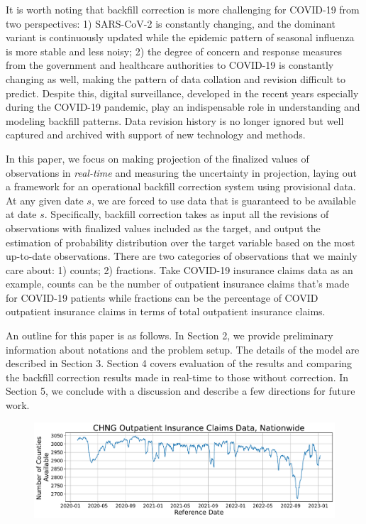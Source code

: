 It is worth noting that backfill correction is more challenging for COVID-19 from two perspectives: 1) SARS-CoV-2 is constantly changing, and the dominant variant is continuously updated while the epidemic pattern of seasonal influenza is more stable and less noisy; 2) the degree of concern and response measures from the government and healthcare authorities to COVID-19 is constantly changing as well, making the pattern of data collation and revision difficult to predict. Despite this, digital surveillance, developed in the recent years especially during the COVID-19 pandemic, play an indispensable role in understanding and modeling backfill patterns. Data revision history is no longer ignored but well captured and archived with support of new technology and methods.


In this paper, we focus on making projection of the finalized values of observations in \textit{real-time} and measuring the uncertainty in projection, laying out a framework for an operational backfill correction system using provisional data. At any given date $s$, we are forced to use data that is guaranteed to be available at date $s$. Specifically, backfill correction takes as input all the revisions of observations with finalized values included as the target, and output the estimation of probability distribution over the target variable based on the most up-to-date observations. There are two categories of observations that we mainly care about: 1) counts; 2) fractions. Take COVID-19 insurance claims data as an example, counts can be the number of outpatient insurance claims that's made for COVID-19 patients while fractions can be the percentage of COVID outpatient insurance claims in terms of total outpatient insurance claims.

An outline for this paper is as follows. In Section 2, we provide preliminary information about notations and the problem setup. The details of the model are described in Section 3. Section 4 covers evaluation of the results and comparing the backfill correction results made in real-time to those without correction. In Section 5, we conclude with a discussion and describe a few directions for future work.


\begin{figure}
    \centering
    \includegraphics[width=\textwidth]{figs/available_counties.pdf}
    \caption{\textit{}}
\end{figure}
